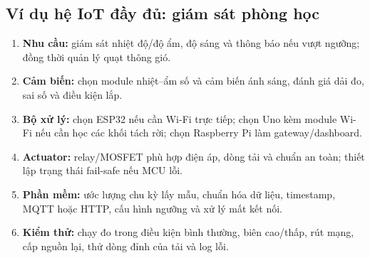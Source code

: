 \subsection{Ví dụ hệ IoT đầy đủ: giám sát phòng học}
\begin{enumerate}
\item \textbf{Nhu cầu:} giám sát nhiệt độ/độ ẩm, độ sáng và thông báo nếu vượt ngưỡng; đồng thời quản lý quạt thông gió.
\item \textbf{Cảm biến:} chọn module nhiệt--ẩm số và cảm biến ánh sáng, đánh giá dải đo, sai số và điều kiện lắp.
\item \textbf{Bộ xử lý:} chọn ESP32 nếu cần Wi-Fi trực tiếp; chọn Uno kèm module Wi-Fi nếu cần học các khối tách rời; chọn Raspberry Pi làm gateway/dashboard.
\item \textbf{Actuator:} relay/MOSFET phù hợp điện áp, dòng tải và chuẩn an toàn; thiết lập trạng thái fail-safe nếu MCU lỗi.
\item \textbf{Phần mềm:} ước lượng chu kỳ lấy mẫu, chuẩn hóa dữ liệu, timestamp, MQTT hoặc HTTP, cấu hình ngưỡng và xử lý mất kết nối.
\item \textbf{Kiểm thử:} chạy đo trong điều kiện bình thường, biên cao/thấp, rút mạng, cấp nguồn lại, thử dòng đỉnh của tải và log lỗi.
\end{enumerate}

